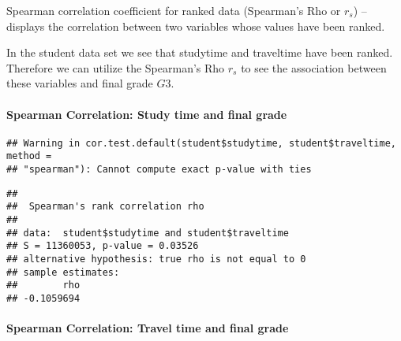 \documentclass[
]{book}
\newenvironment{Shaded}{\begin{snugshade}}{\end{snugshade}}
\newcommand{\AttributeTok}[1]{\textcolor[rgb]{0.13,0.29,0.53}{#1}}
\newcommand{\FunctionTok}[1]{\textcolor[rgb]{0.13,0.29,0.53}{\textbf{#1}}}
\newcommand{\NormalTok}[1]{#1}
\newcommand{\SpecialCharTok}[1]{\textcolor[rgb]{0.81,0.36,0.00}{\textbf{#1}}}
\newcommand{\StringTok}[1]{\textcolor[rgb]{0.31,0.60,0.02}{#1}}
\theoremstyle{definition}
\theoremstyle{definition}
\theoremstyle{definition}
\theoremstyle{definition}
\theoremstyle{remark}
\begin{document}
Spearman correlation coefficient for ranked data (Spearman's Rho or \(r_s\)) -- displays the correlation between two variables whose values have been ranked.

In the student data set we see that studytime and traveltime have been ranked. Therefore we can utilize the Spearman's Rho \(r_s\) to see the association between these variables and final grade \(G3\).

\hypertarget{spearman-correlation-study-time-and-final-grade}{%
\paragraph{Spearman Correlation: Study time and final grade}\label{spearman-correlation-study-time-and-final-grade}}

\begin{Shaded}
\end{Shaded}

\begin{verbatim}
## Warning in cor.test.default(student$studytime, student$traveltime, method =
## "spearman"): Cannot compute exact p-value with ties
\end{verbatim}

\begin{verbatim}
## 
##  Spearman's rank correlation rho
## 
## data:  student$studytime and student$traveltime
## S = 11360053, p-value = 0.03526
## alternative hypothesis: true rho is not equal to 0
## sample estimates:
##        rho 
## -0.1059694
\end{verbatim}

\hypertarget{spearman-correlation-travel-time-and-final-grade}{%
\paragraph{Spearman Correlation: Travel time and final grade}\label{spearman-correlation-travel-time-and-final-grade}}

\begin{Shaded}
\end{Shaded}
\end{document}
